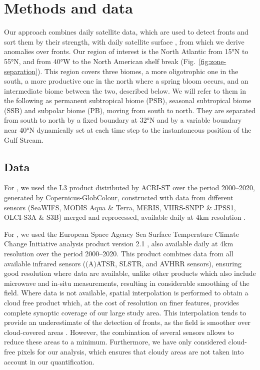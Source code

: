 \section{Methods and data}

Our approach combines daily satellite  data, which are used to detect fronts and sort them by their strength, with daily satellite surface , from which we derive anomalies over fronts.
Our region of interest is the North Atlantic from 15°N to 55°N, and from 40°W to the North American shelf break (Fig.~\ref{fig:zone-separation}).
This region covers three biomes, a more oligotrophic one in the south, a more productive one in the north where a spring bloom occurs, and an intermediate biome between the two, described below.
We will refer to them in the following as permanent subtropical biome (PSB), seasonal subtropical biome (SSB) and subpolar biome (PB), moving from south to north.
They are separated from south to north by a fixed boundary at 32°N and by a variable boundary near 40°N dynamically set at each time step to the instantaneous position of the Gulf Stream.

\subsection{Data}

For , we used the L3 product distributed by ACRI-ST over the period 2000--2020, generated by Copernicus-GlobColour, constructed with data from different sensors (SeaWIFS, MODIS Aqua \& Terra, MERIS, VIIRS-SNPP \& JPSS1, OLCI-S3A \& S3B) merged and reprocessed, available daily at 4km resolution \citep{chl}.

For , we used the European Space Agency Sea Surface Temperature Climate Change Initiative analysis product version 2.1 \citep{merchant_2019, good_2020, sst}, also available daily at 4km resolution over the period 2000--2020.
This product combines data from all available infrared sensors ((A)ATSR, SLSTR, and AVHRR sensors), ensuring good resolution where data are available, unlike other  products which also include microwave and in-situ measurements, resulting in considerable smoothing of the  field. %
Where  data is not available, spatial interpolation is performed to obtain a cloud free product which, at the cost of resolution on finer features, provides complete synoptic coverage of our large study area.
This interpolation tends to provide an underestimate of the detection of fronts, as the  field is smoother over cloud-covered areas \citep{merchant_2019}.
However, the combination of several sensors allows to reduce these areas to a minimum.
Furthermore, we have only considered cloud-free pixels for our analysis, which ensures that cloudy areas are not taken into account in our quantification.


